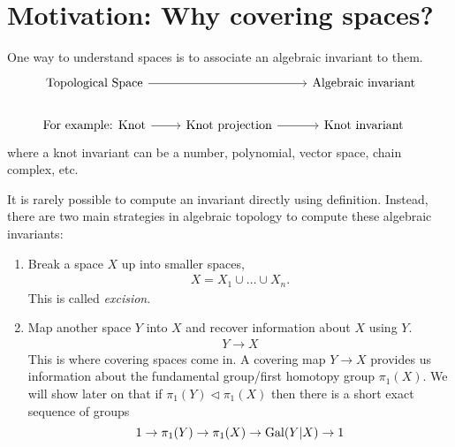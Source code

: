 \maketitle
\section*{Motivation: Why covering spaces?}
One way to understand spaces is to associate an algebraic invariant to them.
\begin{equation*}
  \begin{tikzcd}
    \mbox{Topological Space} \ar[rr] && \mbox{Algebraic invariant} \\
    \mbox{For example: Knot} \ar[r] & \mbox{Knot projection} \ar[r] & \mbox{Knot invariant}
  \end{tikzcd}
\end{equation*}
where a knot invariant can be a number, polynomial, vector space, chain complex, etc.

It is rarely possible to compute an invariant directly using definition.
Instead, there are two main strategies in algebraic topology to compute these algebraic invariants:
\begin{enumerate}
  \item Break a space $X$ up into smaller spaces,
  \begin{align*}
    X = X_1 \cup \dots \cup X_n.
  \end{align*}
  This is called \emph{excision}.
  \item Map another space $Y$ into $X$ and recover information about $X$ using $Y$.
  \begin{align*}
    Y \longrightarrow X
  \end{align*}
  This is where covering spaces come in. A covering map $Y \rightarrow X$ provides us information about the fundamental group/first homotopy group $\pi_1(X)$.
  We will show later on that if $\pi_1(Y) \triangleleft \pi_1(X)$ then there is a short exact sequence of groups
  \begin{equation*}
    1 \rightarrow \pi_1(Y) \rightarrow \pi_1(X) \rightarrow \operatorname{Gal}(Y|X) \rightarrow 1
  \end{equation*}
\end{enumerate}
